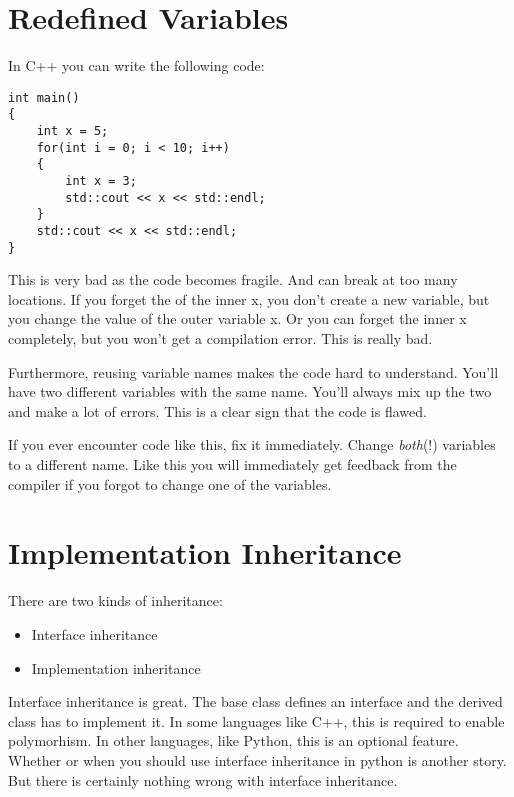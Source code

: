 \section{Redefined Variables}

In C++ you can write the following code:

\begin{programcode}{}
\begin{verbatim}
int main()
{
    int x = 5;
    for(int i = 0; i < 10; i++)
    {
        int x = 3;
        std::cout << x << std::endl;
    }
    std::cout << x << std::endl;
}
\end{verbatim}
\end{programcode}

This is very bad as the code becomes fragile. And can break at too many locations. If you forget the  of the inner x, you don't create a new variable, but you change the value of the outer variable x. Or you can forget the inner x completely, but you won't get a compilation error. This is really bad.

Furthermore, reusing variable names makes the code hard to understand. You'll have two different variables with the same name. You'll always mix up the two and make a lot of errors. This is a clear sign that the code is flawed.

If you ever encounter code like this, fix it immediately. Change \textit{both}(!) variables to a different name. Like this you will immediately get feedback from the compiler if you forgot to change one of the variables.

\section{Implementation Inheritance}

There are two kinds of inheritance:
\begin{itemize}
    \item Interface inheritance
    \item Implementation inheritance
\end{itemize}

Interface inheritance is great. The base class defines an interface and the derived class has to implement it. In some languages like C++, this is required to enable polymorhism. In other languages, like Python, this is an optional feature. Whether or when you should use interface inheritance in python is another story. But there is certainly nothing wrong with interface inheritance.


